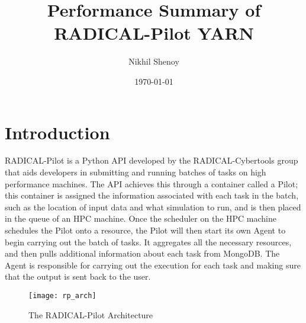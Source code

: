 \documentclass[]{article}
\begin{document}
\title{Performance Summary of RADICAL-Pilot YARN}
\author{Nikhil Shenoy}
\date{\today}
\maketitle


\section{Introduction}
	RADICAL-Pilot is a Python API developed by the RADICAL-Cybertools group that aids developers in submitting and running batches of tasks on high performance machines. The API achieves this through a container called a Pilot; this container is assigned the information associated with each task in the batch, such as the location of input data and what simulation to run, and is then placed in the queue of an HPC machine. Once the scheduler on the HPC machine schedules the Pilot onto a resource, the Pilot will then start its own Agent to begin carrying out the batch of tasks. It aggregates all the necessary resources, and then pulls additional information about each task from MongoDB. The Agent is responsible for carrying out the execution for each task and making sure that the output is sent back to the user.

	\begin{figure}[H]
		\centering
		\texttt{[image: rp\_arch]}
		\caption{The RADICAL-Pilot Architecture \cite{rp_arch}}
		\label{fig:pipeline_block_diagram}
	\end{figure}
\end{document}

